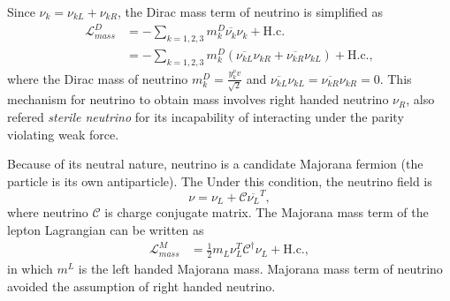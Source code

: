     Since $\nu_k = \nu_{kL} + \nu_{kR}$, the Dirac mass term of neutrino is simplified as
\begin{equation}\label{eq8}
\begin{aligned}
    \mathscr{L}^D_{mass} &= -\sum\limits_{k = 1, 2, 3} m_k^D\overline{\nu_{k}}\nu_{k} + \textrm{H.c.} \\
    & = -\sum\limits_{k = 1, 2, 3}m_k^D(\overline{\nu_{kL}}\nu_{kR} + \overline{\nu_{kR}}\nu_{kL}) + \textrm{H.c.},
\end{aligned}
\end{equation}
    where the Dirac mass of neutrino $m_k^D = \frac{y_k^\nu v}{\sqrt{2}}$ and $\overline{\nu_{kL}}\nu_{kL} = \overline{\nu_{kR}}\nu_{kR} = 0$.
    This mechanism for neutrino to obtain mass involves right handed neutrino $\nu_R$, also refered \textit{sterile neutrino} for its incapability of interacting under the parity violating weak force.
    
    Because of its neutral nature, neutrino is a candidate Majorana fermion (the particle is its own antiparticle).
    The 
    Under this condition, the neutrino field is
    \begin{equation}\label{eq9}
        \nu = \nu_L + \mathcal{C}\overline{\nu_L}^T,
    \end{equation}
    where neutrino $\mathcal{C}$ is charge conjugate matrix.
    The Majorana mass term of the lepton Lagrangian can be written as 
    \begin{equation}\label{eq10}
\begin{aligned}
    \mathscr{L}^M_{mass} &= \frac{1}{2}m_L{\nu_{L}^T} \mathcal{C}^\dagger \nu_{L} + \textrm{H.c.},
\end{aligned}
\end{equation}
    in which $m^L$ is the left handed Majorana mass.
    Majorana mass term of neutrino avoided the assumption of right handed neutrino.
    
